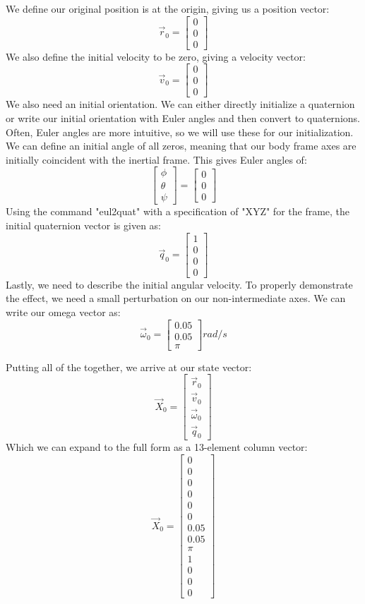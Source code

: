 \documentclass[12pt]{report}
\begin{document}
{We define our original position is at the origin, giving us a position vector:
$$\vec{r}_0=\begin{bmatrix}
    0\\0\\0
\end{bmatrix}$$
We also define the initial velocity to be zero, giving a velocity vector:
$$\vec{v}_0=\begin{bmatrix}
    0\\0\\0
\end{bmatrix}$$
We also need an initial orientation. We can either directly initialize a \gls{quaternion} or write our initial orientation with \gls{Euler angles} and then convert to \glspl{quaternion}. Often, \gls{Euler angles} are more intuitive, so we will use these for our initialization. We can define an initial angle of all zeros, meaning that our body frame axes are initially coincident with the inertial frame. This gives \gls{Euler angles} of:
$$\begin{bmatrix}
    \phi\\\theta\\\psi
\end{bmatrix} =
\begin{bmatrix}
    0\\0\\0
\end{bmatrix}$$
Using the command "eul2quat" with a specification of "XYZ" for the frame, the initial \gls{quaternion} vector is given as:
$$\vec{q}_0=\begin{bmatrix}
    1\\0\\0\\0
\end{bmatrix}$$
Lastly, we need to describe the initial angular velocity. To properly demonstrate the effect, we need a small perturbation on our non-intermediate axes. We can write our omega vector as:
$$\vec{\omega}_0=\begin{bmatrix}
0.05\\0.05\\\pi
\end{bmatrix} rad/s$$

Putting all of the together, we arrive at our \gls{state vector}:
$$\vec{X}_0=\begin{bmatrix}
    \vec{r}_0\\\vec{v}_0\\\vec{\omega}_0\\\vec{q}_0
\end{bmatrix}$$
Which we can expand to the full form as a 13-element column vector:
$$\vec{X}_0=\begin{bmatrix}
    0\\0\\0\\0\\0\\0\\0.05\\0.05\\\pi\\1\\0\\0\\0
\end{bmatrix}$$
}
\end{document}
